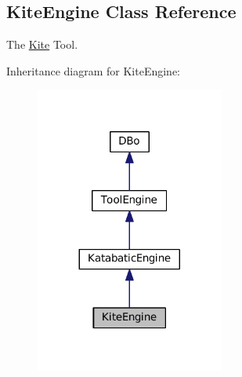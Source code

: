 \hypertarget{classKite_1_1KiteEngine}{}\subsection{Kite\+Engine Class Reference}
\label{classKite_1_1KiteEngine}


The \mbox{\hyperlink{namespaceKite}{Kite}} Tool.  




Inheritance diagram for Kite\+Engine\+:\nopagebreak
\begin{figure}[H]
\begin{center}
\leavevmode
\includegraphics[width=176pt]{classKite_1_1KiteEngine__inherit__graph}
\end{center}
\end{figure}
